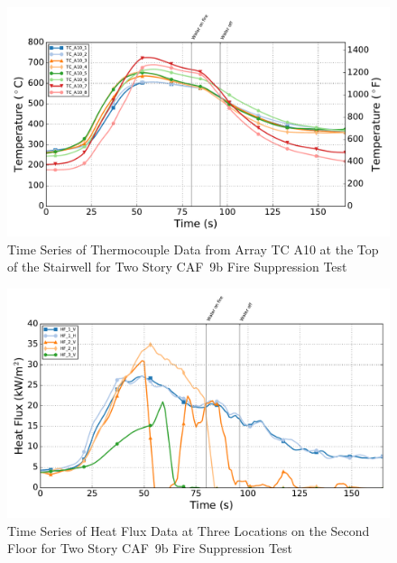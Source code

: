 \documentclass[12pt,oneside]{book}
\begin{document}
\begin{figure}[!ht]
	\includegraphics[width=.85\columnwidth]{../Figures/Script_Figures/Test_41c_West_061415_TC_A10}
	\caption{Time Series of Thermocouple Data from Array TC A10 at the Top of the Stairwell for Two Story CAF~9b Fire Suppression Test}
	\label{fig:app_caf9b_tca10}
\end{figure}

\begin{figure}[!ht]
	\includegraphics[width=.85\columnwidth]{../Figures/Script_Figures/Test_41c_West_061415_Heat_Flux}
	\caption{Time Series of Heat Flux Data at Three Locations on the Second Floor for Two Story CAF~9b Fire Suppression Test}
	\label{fig:app_caf9b_hf}
\end{figure}
\end{document}

